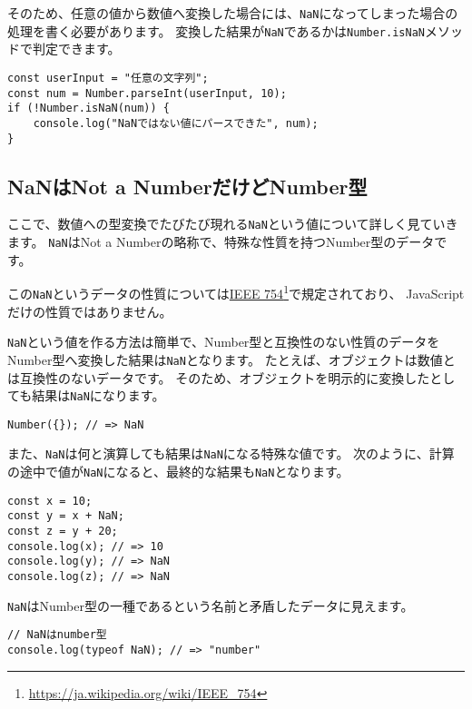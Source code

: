 そのため、任意の値から数値へ変換した場合には、\texttt{NaN}になってしまった場合の処理を書く必要があります。
変換した結果が\texttt{NaN}であるかは\texttt{Number.isNaN}メソッドで判定できます。

\begin{lstlisting}
const userInput = "任意の文字列";
const num = Number.parseInt(userInput, 10);
if (!Number.isNaN(num)) {
    console.log("NaNではない値にパースできた", num);
}
\end{lstlisting}

\hypertarget{nan-is-number-type}{%
\subsection{NaNはNot a NumberだけどNumber型}\label{nan-is-number-type}}

ここで、数値への型変換でたびたび現れる\texttt{NaN}という値について詳しく見ていきます。
\texttt{NaN}はNot a
Numberの略称で、特殊な性質を持つNumber型のデータです。

この\texttt{NaN}というデータの性質については\href{https://ja.wikipedia.org/wiki/IEEE_754}{IEEE
754}\footnote{\url{https://ja.wikipedia.org/wiki/IEEE_754}}で規定されており、 JavaScriptだけの性質ではありません。

\texttt{NaN}という値を作る方法は簡単で、Number型と互換性のない性質のデータをNumber型へ変換した結果は\texttt{NaN}となります。
たとえば、オブジェクトは数値とは互換性のないデータです。
そのため、オブジェクトを明示的に変換したとしても結果は\texttt{NaN}になります。

\begin{lstlisting}
Number({}); // => NaN
\end{lstlisting}

また、\texttt{NaN}は何と演算しても結果は\texttt{NaN}になる特殊な値です。
次のように、計算の途中で値が\texttt{NaN}になると、最終的な結果も\texttt{NaN}となります。

\begin{lstlisting}
const x = 10;
const y = x + NaN;
const z = y + 20;
console.log(x); // => 10
console.log(y); // => NaN
console.log(z); // => NaN
\end{lstlisting}

\texttt{NaN}はNumber型の一種であるという名前と矛盾したデータに見えます。

\begin{lstlisting}
// NaNはnumber型
console.log(typeof NaN); // => "number"
\end{lstlisting}

